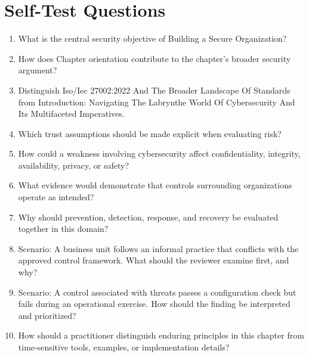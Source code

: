 \documentclass[11pt]{article}
\begin{document}
\section*{Self-Test Questions}
\begin{enumerate}
\item What is the central security objective of Building a Secure Organization?
\item How does Chapter orientation contribute to the chapter's broader security argument?
\item Distinguish Iso/Iec 27002:2022 And The Broader Landscape Of Standards from Introduction: Navigating The Labrynthe World Of Cybersecurity And Its Multifaceted Imperatives.
\item Which trust assumptions should be made explicit when evaluating risk?
\item How could a weakness involving cybersecurity affect confidentiality, integrity, availability, privacy, or safety?
\item What evidence would demonstrate that controls surrounding organizations operate as intended?
\item Why should prevention, detection, response, and recovery be evaluated together in this domain?
\item Scenario: A business unit follows an informal practice that conflicts with the approved control framework. What should the reviewer examine first, and why?
\item Scenario: A control associated with threats passes a configuration check but fails during an operational exercise. How should the finding be interpreted and prioritized?
\item How should a practitioner distinguish enduring principles in this chapter from time-sensitive tools, examples, or implementation details?
\end{enumerate}
\end{document}

